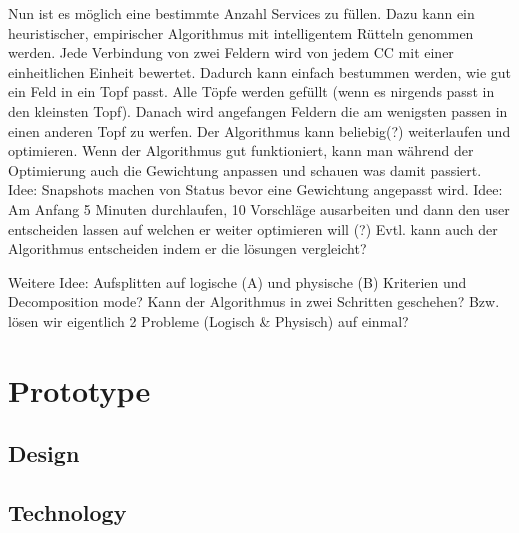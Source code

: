 Nun ist es möglich eine bestimmte Anzahl Services zu füllen. Dazu kann ein heuristischer, empirischer Algorithmus mit intelligentem Rütteln genommen werden. 
Jede Verbindung von zwei Feldern wird von jedem CC mit einer einheitlichen Einheit bewertet. Dadurch kann einfach bestummen werden, wie gut ein Feld in ein Topf passt. Alle Töpfe werden gefüllt (wenn es nirgends passt in den kleinsten Topf). Danach wird angefangen Feldern die am wenigsten passen in einen anderen Topf zu werfen.
Der Algorithmus kann beliebig(?) weiterlaufen und optimieren. Wenn der Algorithmus gut funktioniert, kann man während der Optimierung auch die Gewichtung anpassen und schauen was damit passiert.
Idee: Snapshots machen von Status bevor eine Gewichtung angepasst wird.
Idee: Am Anfang 5 Minuten durchlaufen, 10 Vorschläge ausarbeiten und dann den user entscheiden lassen auf welchen er weiter optimieren will (?) Evtl. kann auch der Algorithmus entscheiden indem er die lösungen vergleicht? 

Weitere Idee: Aufsplitten auf logische (A) und physische (B) Kriterien und Decomposition mode? Kann der Algorithmus in zwei Schritten geschehen? Bzw. lösen wir eigentlich 2 Probleme (Logisch \& Physisch) auf einmal?

\section{Prototype} 

\subsection{Design}

\subsection{Technology}


